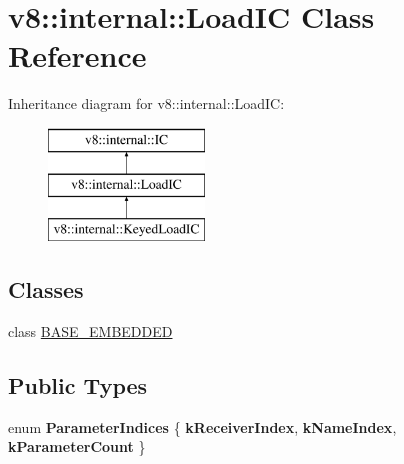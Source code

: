 \hypertarget{classv8_1_1internal_1_1_load_i_c}{}\section{v8\+:\+:internal\+:\+:Load\+I\+C Class Reference}
\label{classv8_1_1internal_1_1_load_i_c}
Inheritance diagram for v8\+:\+:internal\+:\+:Load\+I\+C\+:\begin{figure}[H]
\begin{center}
\leavevmode
\includegraphics[height=3.000000cm]{classv8_1_1internal_1_1_load_i_c}
\end{center}
\end{figure}
\subsection*{Classes}
\begin{DoxyCompactItemize}
\item 
class \hyperlink{classv8_1_1internal_1_1_load_i_c_1_1_b_a_s_e___e_m_b_e_d_d_e_d}{B\+A\+S\+E\+\_\+\+E\+M\+B\+E\+D\+D\+E\+D}
\end{DoxyCompactItemize}
\subsection*{Public Types}
\begin{DoxyCompactItemize}
\item 
\hypertarget{classv8_1_1internal_1_1_load_i_c_a3d9a463a6730fa98548b11ff099709cd}{}enum {\bfseries Parameter\+Indices} \{ {\bfseries k\+Receiver\+Index}, 
{\bfseries k\+Name\+Index}, 
{\bfseries k\+Parameter\+Count}
 \}\label{classv8_1_1internal_1_1_load_i_c_a3d9a463a6730fa98548b11ff099709cd}

\end{DoxyCompactItemize}

